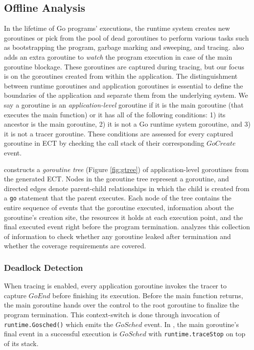 \subsection{Offline Analysis}
\label{sec:ch4_offline_analysis}
In the lifetime of Go programs' executions, the runtime system creates new goroutines or pick from the pool of dead goroutines to perform various tasks such as bootstrapping the program, garbage marking and sweeping, and tracing.
%
\goat also adds an extra goroutine to \textit{watch} the program execution in case of the main goroutine blockage.
%
These goroutines are captured during tracing, but our focus is on the goroutines created from within the application.
%
The distinguishment between runtime goroutines and application goroutines is essential to define the boundaries of the application and separate them from the underlying system.
%
We say a goroutine is an \textit{application-level} goroutine if it is the main goroutine (that executes the main function) or it has all of the following conditions:
1) its ancestor is the main goroutine,
2) it is not a Go runtime system goroutine, and
3) it is not a tracer goroutine.
These conditions are assessed for every captured goroutine in ECT by checking the call stack of their corresponding $GoCreate$ event.

\goat constructs a \textit{goroutine tree} (Figure \ref{fig:gtree}) of application-level goroutines from the generated ECT.
%
Nodes in the goroutine tree represent a goroutine, and directed edges denote parent-child relationships in which the child is created from a \texttt{go} statement that the parent executes.
%
Each node of the tree contains the entire sequence of events that the goroutine executed, information about the goroutine's creation site, the resources it holds at each execution point, and the final executed event right before the program termination.
%
\goat analyzes this collection of information to check whether any goroutine leaked after termination and whether the coverage requirements are covered.

\subsubsection{Deadlock Detection}
When tracing is enabled, every application goroutine invokes the tracer to capture $GoEnd$ before finishing its execution.
%
Before the main function returns, the main goroutine hands over the control to the root goroutine to finalize the program termination.
%
This context-switch is done through invocation of \texttt{runtime.Gosched()} which emits the $GoSched$ event.
%
In \goat, the main goroutine's final event in a successful execution is $GoSched$ with \texttt{runtime.traceStop} on top of its stack.


